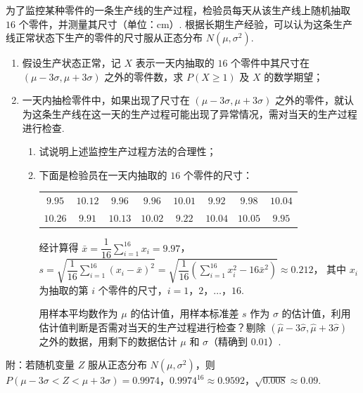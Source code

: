 \begin{problem}
为了监控某种零件的一条生产线的生产过程，检验员每天从该生产线上随机抽取 \(16\) 个零件，并测量其尺寸（单位：\(\mathrm{cm}\)）. 根据长期生产经验，可以认为这条生产线正常状态下生产的零件的尺寸服从正态分布 \(N(\mu,\sigma^2)\).

\begin{enumerate}
\item 假设生产状态正常，记 \(X\) 表示一天内抽取的 \(16\) 个零件中其尺寸在 \((\mu-3\sigma,\mu+3\sigma)\) 之外的零件数，求 \(P(X\ge1)\) 及 \(X\) 的数学期望；
\item 一天内抽检零件中，如果出现了尺寸在 \((\mu-3\sigma,\mu+3\sigma)\) 之外的零件，就认为这条生产线在这一天的生产过程可能出现了异常情况，需对当天的生产过程进行检查.
\begin{enumerate}
\item 试说明上述监控生产过程方法的合理性；
\item 下面是检验员在一天内抽取的 \(16\) 个零件的尺寸：

{\renewcommand{\arraystretch}{0.8}
\begin{center}
\begin{tabular}{cccccccc}
\(9.95\) & \(10.12\) & \(9.96\) & \(9.96\) & \(10.01\) & \(9.92\) & \(9.98\) & \(10.04\) \\
\(10.26\) & \(9.91\) & \(10.13\) & \(10.02\) & \(9.22\) & \(10.04\) & \(10.05\) & \(9.95\)
\end{tabular}
\end{center}}

经计算得 \(\bar x=\dfrac1{16}\sum_{i=1}^{16}x_i=9.97\)，
\(s=\sqrt{\dfrac1{16}\sum_{i=1}^{16}(x_i-\bar x)^2}
=\sqrt{\dfrac1{16}\left(\sum_{i=1}^{16}x_i^2-16\bar x^2\right)}\approx0.212\)，
其中 \(x_i\) 为抽取的第 \(i\) 个零件的尺寸，\(i=1\)，\(2\)，\(\dots\)，\(16\).

用样本平均数作为 \(\mu\) 的估计值，用样本标准差 \(s\) 作为 \(\sigma\) 的估计值，利用估计值判断是否需对当天的生产过程进行检查？剔除 \((\hat\mu-3\hat\sigma,\hat\mu+3\hat\sigma)\) 之外的数据，用剩下的数据估计 \(\mu\) 和 \(\sigma\)（精确到 \(0.01\)）.
\end{enumerate}
\end{enumerate}

附：若随机变量 \(Z\) 服从正态分布 \(N(\mu,\sigma^2)\)，则 \(P(\mu-3\sigma<Z<\mu+3\sigma)=0.9974\)，\(0.9974^{16}\approx0.9592\)，\(\sqrt{0.008}\approx0.09\).
\end{problem}

